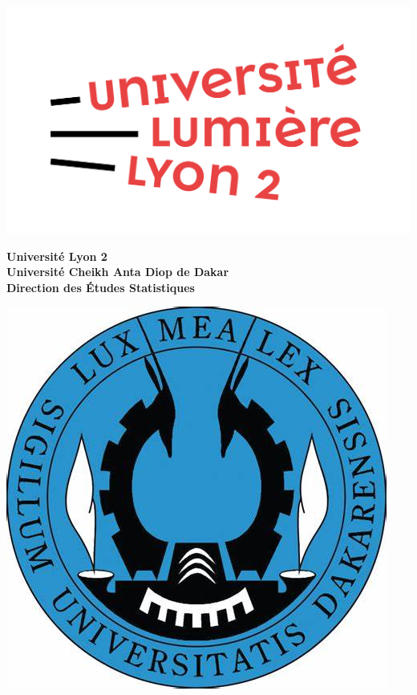 \documentclass{article}
\begin{document}
\vspace*{-1.5cm}
\begin{tcolorbox}[colframe=myblue, colback=white, boxrule=1pt, arc=4pt, width=\textwidth, left=0pt, right=0pt, top=2pt, bottom=2pt]
    \begin{minipage}{0.18\textwidth}
        \includegraphics[width=\textwidth]{image/lyon.png}
    \end{minipage}
    \hfill
    \begin{minipage}{0.6\textwidth}
        \centering
        {\large\bfseries Université Lyon 2}\\[0.5em]
        {\large\bfseries Université Cheikh Anta Diop de Dakar}\\[0.5em]
        {\large\bfseries Direction des Études Statistiques}
    \end{minipage}
    \hfill
    \begin{minipage}{0.18\textwidth}
        \includegraphics[width=\textwidth]{image/ucad.jpg}
    \end{minipage}
\end{tcolorbox}
\end{document}
